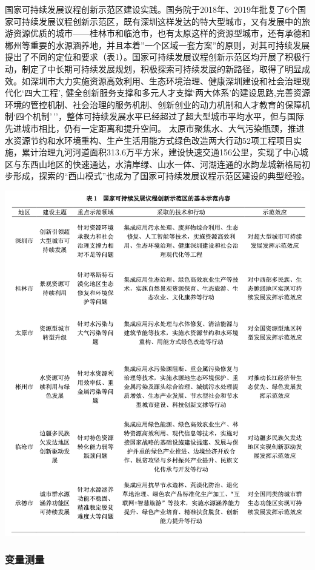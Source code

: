 \documentclass[
  12pt,
]{ctexart}
\begin{document}
国家可持续发展议程创新示范区建设实践。国务院于2018年、2019年批复了6个国家可持续发展议程创新示范区，既有深圳这样发达的特大型城市，又有发展中的旅游资源优质的城市------桂林市和临沧市，也有太原这样的资源型城市，还有承德和郴州等重要的水源涵养地，并且本着''一个区域一套方案''的原则，对其可持续发展提出了不同的定位和要求（表1）。国家可持续发展议程创新示范区均开展了积极行动，制定了中长期可持续发展规划，积极探索可持续发展的新路径，取得了明显成效。如深圳市大力实施资源高效利用、生态环境治理、健康深圳建设和社会治理现代化`四大工程', 健全创新服务支撑和多元人才支撑`两大体系'的建设思路,完善资源环境的管控机制、社会治理的服务机制、创新创业的动力机制和人才教育的保障机制`四个机制'\,''，整体可持续发展水平已经超过了超大型城市平均水平，但与国际先进城市相比，仍有一定距离和提升空间。 太原市聚焦水、大气污染瓶颈，推进水资源节约和水环境重构、生产生活用能方式绿色改造两大行动52项工程项目实施，累计治理九河河道面积313.6万平方米，建设快速交通156公里，实现了中心城区与东西山地区的快速通达，水清岸绿、山水一体、河湖连通的水韵龙城新格局初步形成，探索的``西山模式''也成为了国家可持续发展议程示范区建设的典型经验。

\begin{center}\includegraphics[width=0.9\linewidth]{../figures/table1} \end{center}

\hypertarget{ux53d8ux91cfux6d4bux91cf}{%
\subsubsection{变量测量}\label{ux53d8ux91cfux6d4bux91cf}}
\end{document}
